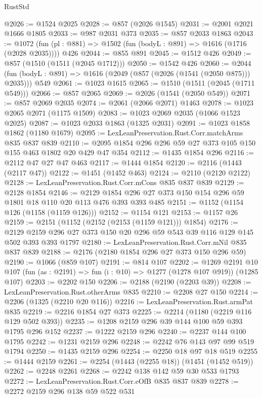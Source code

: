 \begin{lexlean}{RustStd}
\begin{coremodule}
@2026 := @1524 @2025
@2028 := @857 (@2026 @1545)
@2031 := @2001 @2021 @1666 @1805
@2033 := @987 @2031 @373
@2035 := @857 @2033 @1863
@2043 := @1072 (fun (pl : @881) => @1502 (fun (bodyL : @891) => @1616 (@1716 (@2028 @2035)))) @426
@2044 := @855 @891
@2045 := @1512 @426
@2049 := @857 (@1510 (@1511 (@2045 @1712)))
@2050 := @1542 @426
@2060 := @2044 (fun (bodyL : @891) => @1616 (@2049 (@857 (@2026 (@1541 (@2050 @875))) @2035))) @549
@2061 := @1023 @1615
@2065 := @1510 (@1511 (@2045 (@1711 @549)))
@2066 := @857 @2065
@2069 := @2026 (@1541 (@2050 @549))
@2071 := @857 @2069 @2035
@2074 := @2061 (@2066 @2071) @1463
@2078 := @1023 @2065 @2071 (@1175 @1509)
@2083 := @1023 @2069 @2035 (@1066 @1523 @2025)
@2087 := @1023 @2033 @1863 (@1325 @2031)
@2091 := @1023 @1858 @1862 (@1180 @1679)
@2095 := LexLeanPreservation.Rust.Corr.matchArms @835 @837 @839
@2110 := @2095 @1854 @296 @296 @59 @27 @373 @105 @150 @155 @463 @1802 @20 @429 @47 @354
@2112 := @1435 @1854 @296
@2116 := @2112 @47 @27 @47 @463
@2117 := @1444 @1854
@2120 := @2116 (@1443 (@2117 @47))
@2122 := @1451 (@1452 @463)
@2124 := @2110 (@2120 @2122)
@2128 := LexLeanPreservation.Rust.Corr.mCons @835 @837 @839
@2129 := @2128 @1854
@2146 := @2129 @1854 @296 @27 @373 @150 @154 @296 @59 @1801 @18 @110 @20 @113 @476 @393 @393 @485
@2151 := @1152 (@1154 @126 (@1158 (@1159 @126)))
@2152 := @1154 @121
@2153 := @1157 @26
@2159 := @2151 (@1152 (@2152 (@2153 (@1159 @121))) @1854)
@2176 := @2129 @2159 @296 @27 @373 @150 @20 @296 @59 @543 @39 @116 @129 @145 @502 @393 @393 @1797
@2180 := LexLeanPreservation.Rust.Corr.mNil @835 @837 @839
@2188 := @2176 (@2180 @1854 @296 @27 @373 @150 @296 @59)
@2190 := @1066 (@859 @107)
@2191 := @814 @107
@2202 := @1269
    @2191
    @10
    @107
    (fun (as : @2191) => fun (i : @10) => @1277 (@1278 @107 @919))
    (@1285 @107)
@2203 := @2202 @150
@2206 := @2188 (@2190 (@2203 @39))
@2208 := LexLeanPreservation.Rust.otherArms @835
@2210 := @2208 @27 @150
@2214 := @2206 (@1325 (@2210 @20 @116))
@2216 := LexLeanPreservation.Rust.armPat @835
@2219 := @2216 @1854 @27 @373
@2225 := @2214 (@1180 (@2219 @116 @129 @502 @393))
@2235 := @1208 @2159 @296 @39 @144 @100 @59 @393 @1795 @296 @152
@2237 := @1222 @2159 @296
@2240 := @2237 @144 @100 @1795
@2242 := @1231 @2159 @296
@2248 := @2242 @76 @143 @97 @99 @519 @1794
@2250 := @1435 @2159 @296
@2254 := @2250 @18 @97 @18 @519
@2255 := @1444 @2159
@2261 := @2254 (@1443 (@2255 @18)) (@1451 (@1452 @519))
@2262 := @2248 @2261
@2268 := @2242 @138 @142 @59 @30 @533 @1793
@2272 := LexLeanPreservation.Rust.Corr.eOfB @835 @837 @839
@2278 := @2272 @2159 @296 @138 @59 @522 @531

\end{coremodule}
\end{lexlean}
